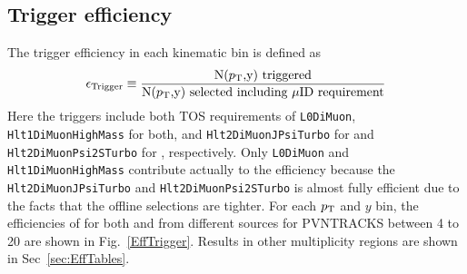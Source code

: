\subsection{Trigger efficiency}
The trigger efficiency in each kinematic bin is defined as 
\begin{equation}
\epsilon_{\mathrm{Trigger}} \equiv \frac{\mbox{N($p_{\mathrm{T}}$,y) triggered}}{\mbox{N($p_{\mathrm{T}}$,y) selected including $\mu$ID requirement}} 
\end{equation}
Here the triggers include both TOS requirements of \texttt{L0DiMuon}, \texttt{Hlt1DiMuonHighMass} for both, and \texttt{Hlt2DiMuonJPsiTurbo} for \jpsi and \texttt{Hlt2DiMuonPsi2STurbo} for \psitwos, respectively. 
Only \texttt{L0DiMuon} and \texttt{Hlt1DiMuonHighMass} contribute actually to the efficiency because the \texttt{Hlt2DiMuonJPsiTurbo} and \texttt{Hlt2DiMuonPsi2STurbo} is almost fully efficient due to the facts that the offline selections are tighter.
For each $p_{\mathrm{T}}$ and $y$ bin, the efficiencies of \effTrigger for both \jpsi and \psitwos from different sources for PVNTRACKS between 4 to 20 are shown in Fig.~\ref{EffTrigger}. Results in other multiplicity regions are shown in Sec~\ref{sec:EffTables}.
